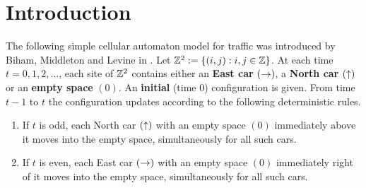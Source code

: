 \documentclass[reqno]{amsart}
\begin{document}
\begin{abstract}
    A configuration of East cars and North cars is initialised on the $n$-by-$n$ integer lattice. At each odd time step each North car moves one site North if the site directly above it is vacant and leaves the grid if it is on the top row. At each even time step East cars move similarly East. We investigate the time until the grid clears of all cars. In particular, we provide simulation evidence of superlinear clearing times asymptotically in $n$ arising from random and periodic configurations. We further give an upper bound of order $n^2$ for the maximal clearing time of the grid.
\end{abstract}

\maketitle



\section{Introduction}

The following simple cellular automaton model for traffic was introduced by Biham, Middleton and Levine in \cite{bmlmodel}. Let $\mathbb{Z}^2 := \{ (i,j) : i, j \in \mathbb{Z} \}$. At each time $t=0,1,2,\ldots$, each site of $\mathbb{Z}^2$ contains either an \textbf{East car} $(\mathord{\rightarrow})$, a \textbf{North car} $(\mathord{\uparrow})$ or an \textbf{empty space} $(0)$. An \textbf{initial} (time $0$) configuration is given. From time $t-1$ to $t$ the configuration updates according to the following deterministic rules.
\begin{enumerate}
    \item[$(i)$] If $t$ is odd, each North car $(\mathord{\uparrow})$ with an empty space $(0)$ immediately above it moves into the empty space, simultaneously for all such cars.
    \item[$(ii)$] If $t$ is even, each East car $(\mathord{\rightarrow})$ with an empty space $(0)$ immediately right of it moves into the empty space, simultaneously for all such cars.
\end{enumerate}
\end{document}
